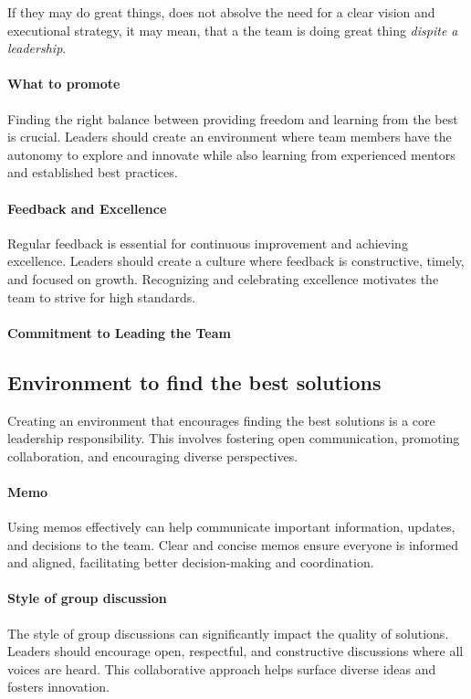 If they may do great things, does not absolve the need for a clear vision and executional strategy,  it may mean, that a the team is doing great thing \textit{dispite a leadership}.


\paragraph{What to promote}
Finding the right balance between providing freedom and learning from the best is crucial. Leaders should create an environment where team members have the autonomy to explore and innovate while also learning from experienced mentors and established best practices. 


\paragraph{Feedback and Excellence}
Regular feedback is essential for continuous improvement and achieving excellence. Leaders should create a culture where feedback is constructive, timely, and focused on growth. Recognizing and celebrating excellence motivates the team to strive for high standards.

\paragraph{Commitment to Leading the Team}

\subsection{Environment to find the best solutions}
Creating an environment that encourages finding the best solutions is a core leadership responsibility. This involves fostering open communication, promoting collaboration, and encouraging diverse perspectives.

\paragraph{Memo}
Using memos effectively can help communicate important information, updates, and decisions to the team. Clear and concise memos ensure everyone is informed and aligned, facilitating better decision-making and coordination.

\paragraph{Style of group discussion}
The style of group discussions can significantly impact the quality of solutions. Leaders should encourage open, respectful, and constructive discussions where all voices are heard. This collaborative approach helps surface diverse ideas and fosters innovation.

